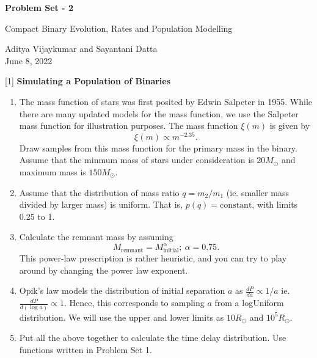 \documentclass{article} %
\newcommand{\question}[2][]{\begin{flushleft}
        \textbf{Problem #1}: %
\end{flushleft}
}
\newcommand{\maketitletwo}[2][]{\begin{center}
        \Large{\textbf{Problem Set - 2}
            
            Compact Binary Evolution, Rates and Population Modelling} %
        \vspace{10pt}
        
        \normalsize{Aditya Vijaykumar and Sayantani Datta  %
        } \\
        \vspace{5pt}  June 8, 2022     %
        \vspace{15pt}
        
\end{center}}
\begin{document}
    \maketitletwo[5]  %
    
    \question[1]{} \textbf{Simulating a Population of Binaries} 
    
    \begin{enumerate}
    \item The mass function of stars was first posited by Edwin Salpeter in 1955. While there are many updated models for the mass function, we use the Salpeter mass function for illustration purposes. The mass function $\xi(m)$ is given by $$\xi(m) \propto m^{-2.35}.$$ Draw samples from this mass function for the primary mass in the binary. Assume that the minmum mass of stars under consideration is $20 M_\odot$ and maximum mass is $150 M_\odot$. 
    
    \item Assume that the distribution of mass ratio $q=m_2/m_1$ (ie. smaller mass divided by larger mass) is uniform. That is, $p(q) = \mathrm{constant}$, with limits 0.25 to 1.
    
    \item Calculate the remnant mass by assuming $$M_\mathrm{remnant} = M_\mathrm{initial}^{\alpha}; \ \alpha = 0.75.$$ This power-law prescription is rather heuristic, and you can try to play around by changing the power law exponent.
    
    
    \item Opik's law models the distribution of initial separation $a$  as $\frac{dP}{da} \propto 1/a $ ie. $\frac{dP}{d(\log a)} \propto 1$. Hence, this corresponds to sampling $a$ from a logUniform distribution. We will use the upper and lower limits as $10 R_\odot$ and $10^5 R_\odot$.
    \item  Put all the above together to calculate the time delay distribution. Use functions written in Problem Set 1.
\end{enumerate}
\end{document}
